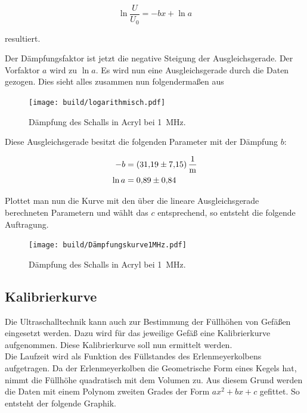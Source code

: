 \begin{equation*}
    \ln{\frac{U}{U_0}} = {-bx} + \ln{a}
\end{equation*}

\noindent resultiert.

\noindent Der Dämpfungsfaktor ist jetzt die negative Steigung der Ausgleichsgerade. Der Vorfaktor $a$ wird 
zu $\ln{a}$. Es wird nun eine Ausgleichsgerade durch die Daten gezogen. Dies sieht alles zusammen nun folgendermaßen aus

\begin{figure}[H]
    \centering
    \texttt{[image: build/logarithmisch.pdf]}
    \caption{Dämpfung des Schalls in Acryl bei \qty{1}{\mega\hertz}.}
\end{figure}

\noindent Diese Ausgleichsgerade besitzt die folgenden Parameter mit der Dämpfung $b$:

\begin{align*}
    -b &= \qty{31.19\pm7.15}{\per \meter} \\
    \ln{a} &= \num{0.89\pm0.84} \\
\end{align*}

\noindent Plottet man nun die Kurve mit den über die lineare Ausgleichsgerade berechneten Parametern und wählt das $c$ entsprechend, 
so entsteht die folgende Auftragung.

\begin{figure}[H]
    \centering
    \texttt{[image: build/Dämpfungskurve1MHz.pdf]}
    \caption{Dämpfung des Schalls in Acryl bei \qty{1}{\mega\hertz}.}
\end{figure}



\subsection{Kalibrierkurve}
Die Ultraschalltechnik kann auch zur Bestimmung der Füllhöhen von Gefäßen eingesetzt werden. Dazu wird für das jeweilige Gefäß 
eine Kalibrierkurve aufgenommen. Diese Kalibrierkurve soll nun ermittelt werden. \\
\noindent Die Laufzeit wird als Funktion des Füllstandes des Erlenmeyerkolbens aufgetragen. Da der Erlenmeyerkolben 
die Geometrische Form eines Kegels hat, nimmt die Füllhöhe quadratisch mit dem Volumen zu. Aus diesem Grund werden die Daten 
mit einem Polynom zweiten Grades der Form $ax^2 +bx +c$ gefittet. So entsteht der folgende Graphik.

